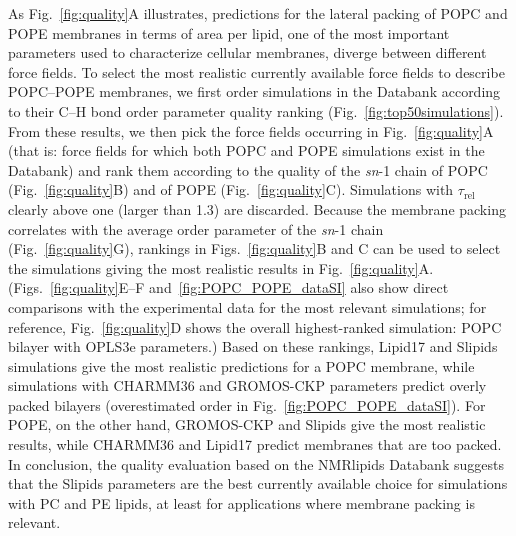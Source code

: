 \documentclass[fleqn,10pt]{wlscirep}
\begin{document}
As Fig.~\ref{fig:quality}A illustrates, predictions for the lateral packing of POPC and POPE membranes in terms of area per lipid, one of the most important parameters used to characterize cellular membranes, diverge between different force fields. To select the most realistic currently available force fields to describe POPC--POPE membranes, we first order simulations in the Databank according to their C--H bond order parameter quality ranking (Fig.~\ref{fig:top50simulations}). From these results, we then pick the force fields occurring in Fig.~\ref{fig:quality}A (that is: force fields for which both POPC and POPE simulations exist in the Databank) and rank them according to the quality of the \textit{sn}-1 chain of POPC (Fig.~\ref{fig:quality}B) and of POPE (Fig.~\ref{fig:quality}C). Simulations with $\tau_\mathrm{rel}$ clearly above one (larger than 1.3) are discarded. Because the membrane packing correlates with the average order parameter of the \textit{sn}-1 chain (Fig.~\ref{fig:quality}G), rankings in Figs.~\ref{fig:quality}B and C can be used to select the simulations giving the most realistic results in Fig.~\ref{fig:quality}A. (Figs.~\ref{fig:quality}E--F and~\ref{fig:POPC_POPE_dataSI} also show direct comparisons with the experimental data for the most relevant simulations; for reference, Fig.~\ref{fig:quality}D shows the overall highest-ranked simulation: POPC bilayer with OPLS3e parameters.) Based on these rankings, Lipid17 and Slipids simulations give the most realistic predictions for a POPC membrane, while simulations with CHARMM36 and GROMOS-CKP parameters predict overly packed bilayers (overestimated order in Fig.~\ref{fig:POPC_POPE_dataSI}). For POPE, on the other hand, GROMOS-CKP and Slipids give the most realistic results, while CHARMM36 and Lipid17 predict membranes that are too packed. In conclusion, the quality evaluation based on the NMRlipids Databank suggests that the Slipids parameters are the best currently available choice for simulations with PC and PE lipids, at least for applications where membrane packing is relevant.
\end{document}
